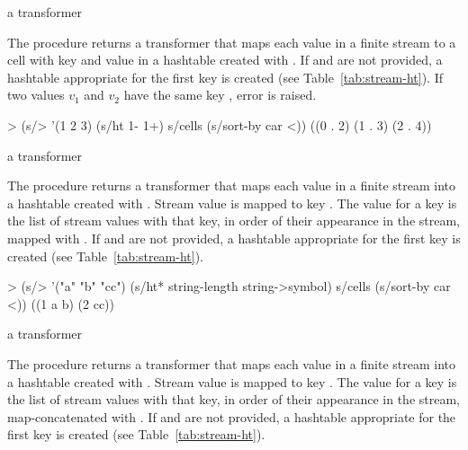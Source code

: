 \begin{procedure}
\end{procedure}
\returns{} a transformer

The  procedure returns a transformer that maps each value  in a finite
stream to a cell with key  and value  in a hashtable created
with . If  and  are
not provided, a hashtable appropriate for the first key is created (see
Table~\ref{tab:stream-ht}).  If two values $v_1$ and $v_2$ have the same key ,
error  is raised.

\codebegin
> (s/> '(1 2 3)
    (s/ht 1- 1+)
    s/cells
    (s/sort-by car <))
((0 . 2) (1 . 3) (2 . 4))
\codeend

\begin{procedure}
\end{procedure}
\returns{} a transformer

The  procedure returns a transformer that maps each value in a finite stream
into a hashtable created with . Stream
value  is mapped to key . The value for a key is the list of stream
values with that key, in order of their appearance in the stream, mapped with . If
 and  are not provided, a hashtable appropriate for the first key is
created (see Table~\ref{tab:stream-ht}).

\codebegin
> (s/> '("a" "b" "cc")
    (s/ht* string-length string->symbol)
    s/cells
    (s/sort-by car <))
((1 a b) (2 cc))
\codeend

\begin{procedure}
\end{procedure}
\returns{} a transformer

The  procedure returns a transformer that maps each value in a finite stream
into a hashtable created with . Stream
value  is mapped to key . The value for a key is the list of stream
values with that key, in order of their appearance in the stream, map-concatenated with
. If  and  are not provided, a hashtable appropriate for the
first key is created (see Table~\ref{tab:stream-ht}).

